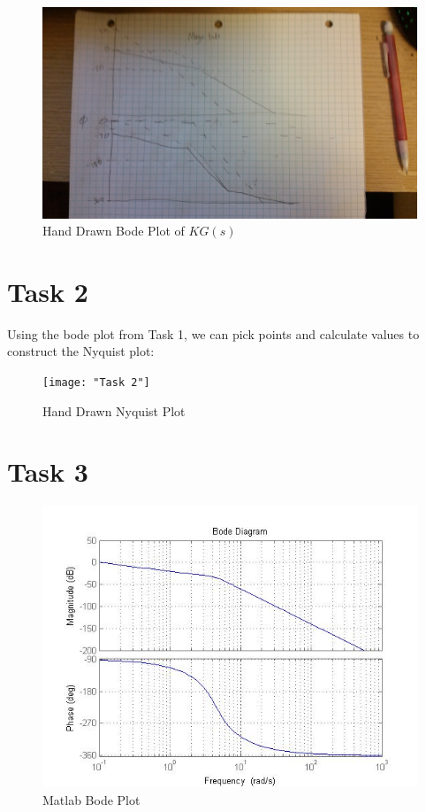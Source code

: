 \documentclass[12pt,letter]{article}
\begin{document}
\begin{figure}[H]
\centering
\includegraphics[width=1\linewidth]{Task1}
\caption{Hand Drawn Bode Plot of $KG(s)$}
\label{fig:Task1}
\end{figure}

\section*{Task 2}
Using the bode plot from Task 1, we can pick points and calculate values to construct the Nyquist plot:

\begin{figure}[H]
\centering
\texttt{[image: "Task 2"]}
\caption{Hand Drawn Nyquist Plot}
\label{fig:Task2}
\end{figure}

\section*{Task 3}


\begin{figure}[H]
\centering
\includegraphics[width=1\linewidth]{Task3}
\caption{Matlab Bode Plot}
\label{fig:Task3}
\end{figure}
\end{document}
